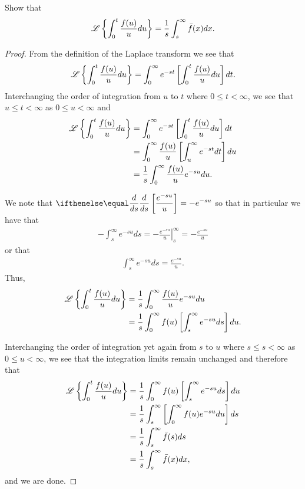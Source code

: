 \begin{problem}{3.6}
  Show that
  \begin{align*}
    \mathscr{L}\left\{ {\int_0^t \frac{f(u)}{u} du} \right\} = \frac{1}{s} \int_s^\infty \bar{f}(x) dx.
  \end{align*}
\end{problem}

\begin{proof}
  From the definition of the Laplace transform we see that
  \begin{align*}
    \mathscr{L}\left\{ {\int_0^t \frac{f(u)}{u} du} \right\} = \int_0^\infty e^{-st} \left[\int_0^t \frac{f(u)}{u} du\right]dt.
  \end{align*}
  Interchanging the order of integration from $u$ to $t$ where $0 \leq t < \infty$,
  we see that $u \leq t < \infty$ as $0 \leq u < \infty$ and
  \begin{align*}
    \mathscr{L}\left\{ {\int_0^t \frac{f(u)}{u} du} \right\} &= \int_0^\infty e^{-st} \left[\int_0^t \frac{f(u)}{u} du\right]dt \\
    &= \int_0^\infty \frac{f(u)}{u}  \left[\int_u^\infty e^{-st}dt\right]du \\
    &= \frac{1}{s} \int_0^\infty \frac{f(u)}{u} e^{-su} du.
  \end{align*}

  We note that $\displaystyle \der{s}{}\left[\frac{e^{-su}}{u}\right] = -e^{-su}$
  so that in particular we have that
  \begin{align*}
    - \int_s^\infty e^{-su} ds = \left.-\frac{e^{-su}}{u}\right\rvert_s^\infty = -\frac{e^{-su}}{u}
  \end{align*}
  or that
  \begin{align*}
    \int_s^\infty e^{-su} ds = \frac{e^{-su}}{u}.
  \end{align*}
  Thus,
  \begin{align*}
    \mathscr{L}\left\{ {\int_0^t \frac{f(u)}{u} du} \right\}
    &= \frac{1}{s} \int_0^\infty \frac{f(u)}{u} e^{-su} du \\
    &= \frac{1}{s}\int_0^\infty f(u)\left[\int_s^\infty e^{-su} ds \right]du.
  \end{align*}

  Interchanging the order of integration yet again from $s$ to $u$ where $s \leq s < \infty$
  as $0 \leq u < \infty$, we see that the integration limits remain unchanged and therefore
  that
  \begin{align*}
    \mathscr{L}\left\{ {\int_0^t \frac{f(u)}{u} du} \right\}
    &= \frac{1}{s}\int_0^\infty f(u) \left[\int_s^\infty e^{-su} ds\right] du \\
    &= \frac{1}{s}\int_s^\infty \left[\int_0^\infty f(u)e^{-su} du\right] ds \\
    &= \frac{1}{s}\int_s^\infty \bar{f}(s) ds \\
    &= \frac{1}{s}\int_s^\infty \bar{f}(x) dx,
  \end{align*}
  and we are done.

\end{proof}
\newpage
